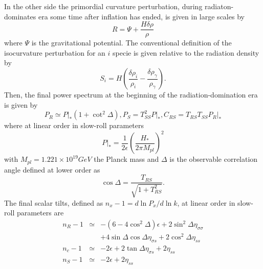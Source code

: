 \documentclass[amssymb,twocolumn,prd,nofootinbib,showpacs]{revtex4-1}
\begin{document}
In the other side the primordial curvature perturbation, during radiaton-dominates era some time after inflation has ended, is given in large scales by
\begin{equation}
R=\Psi+\frac{H\delta\rho}{\rho}
\end{equation}
where $\Psi$ is the gravitational potential. The conventional definition of the isocurvature perturbation for an $i$ specie is given relative to the radiation density by
\begin{equation}
S_i=H\left(\frac{\delta\rho_{i}}{\rho_{i}}-\frac{\delta\rho_\gamma}{\rho_\gamma}\right).
\end{equation}
Then, the final power spectrum at the beginning of the radiation-domination era is given by
\begin{subequations}\label{spectrums}
\begin{equation}\label{PRf}
P_R\simeq P|_*(1+\cot^2\Delta),
\end{equation}
\begin{equation}\label{isosecond}
P_S=T^2_{SS}P|_*,
\end{equation}
\begin{equation}
C_{RS}=T_{RS}T_{SS}P_R|_*
\end{equation}
\end{subequations}
where at linear order in slow-roll parameters
\begin{equation}
P|_*=\frac{1}{2\epsilon}\left(\frac{H_*}{2\pi M_{pl}}\right)^2
\end{equation}
with $M_{pl}=1.221\times 10^{19}GeV$ the Planck mass and $\Delta$ is the observable correlation angle defined at lower order as
\begin{equation}
\cos\Delta =\frac{T_{RS}}{\sqrt{1+T_{RS}^2}}.
\end{equation}
The final scalar tilts, defined as $n_x-1=d\ln P_x/d\ln k$, at linear order in slow-roll parameters are
\begin{subequations}\label{tilts}
\begin{eqnarray}
n_R-1&\simeq & -(6-4\cos^2\Delta)\epsilon+2\sin^2\Delta\eta_{\sigma\sigma}\nonumber \\ &&+4\sin\Delta\cos\Delta\eta_{\sigma s}+2\cos^2\Delta\eta_{ss}\\
n_c-1&\simeq &-2\epsilon+2\tan\Delta\eta_{\sigma s}+2\eta_{ss}\\
n_S-1&\simeq & -2\epsilon+2\eta_{ss}
\end{eqnarray}
\end{subequations}
\end{document}
